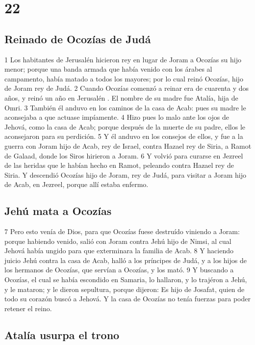 \chapter{22}

\section*{Reinado de Ocozías de Judá}

 

1 Los habitantes de Jerusalén  hicieron rey en lugar de Joram a Ocozías su hijo menor; porque una banda armada que  había venido con los árabes al campamento, había matado a todos los mayores; por lo cual reinó Ocozías, hijo de Joram rey de Judá.
2 Cuando Ocozías comenzó a reinar era de cuarenta y dos años, y reinó un año en Jerusalén . El nombre de su madre fue Atalía, hija de Omri.
3 También él anduvo en los caminos de la casa de Acab: pues su madre le aconsejaba a que actuase impíamente.
4 Hizo pues lo malo ante los ojos de Jehová, como la casa de Acab; porque después de la muerte de su padre, ellos le aconsejaron para su perdición.
5 Y él anduvo en los consejos de ellos, y fue a la guerra con Joram hijo de Acab, rey de Israel, contra Hazael rey de Siria, a Ramot de Galaad, donde los Siros hirieron a Joram.
6 Y volvió para curarse en Jezreel de las heridas que le habían hecho en Ramot, peleando contra Hazael rey de Siria. Y descendió Ocozías hijo de Joram, rey de Judá, para visitar a Joram hijo de Acab, en Jezreel, porque allí estaba enfermo.
\section*{Jehú mata a Ocozías}

 
7  Pero esto venía de Dios, para que Ocozías fuese destruído viniendo a Joram: porque habiendo venido, salió con Joram contra Jehú hijo de Nimsi, al cual Jehová había ungido para que exterminara la familia de Acab.
8 Y haciendo juicio Jehú contra la casa de Acab, halló a los príncipes de Judá, y a los hijos de los hermanos de Ocozías, que servían a Ocozías, y los mató.
9 Y buscando a Ocozías, el cual se había escondido en Samaria, lo hallaron, y lo trajéron a Jehú, y le mataron; y le dieron sepultura, porque dijeron: Es hijo de Josafat, quien de todo su corazón buscó a Jehová. Y la casa de Ocozías no tenía fuerzas para poder retener el reino.
\section*{Atalía usurpa el trono}

